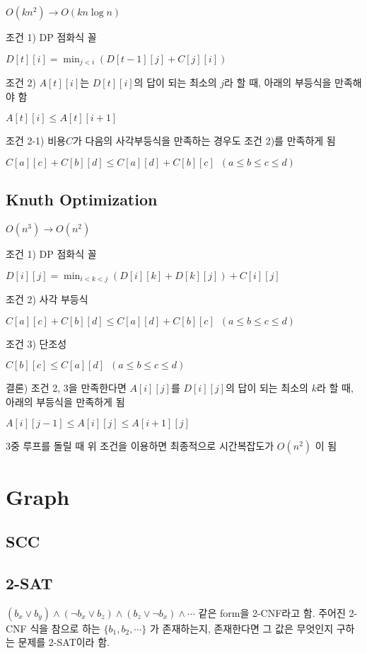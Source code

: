 \documentclass[10pt,landscape,a4paper,twocolumn]{article}
\begin{document}
$O(kn^{2}) \to O(kn\log{n})$

조건 1) DP 점화식 꼴

$D[t][i] = \min_{j<i}( D[t-1][j] + C[j][i] )$

조건 2) $A[t][i]$는 $D[t][i]$의 답이 되는 최소의 $j$라 할 때, 아래의 부등식을 만족해야 함

$A[t][i] \leq A[t][i+1]$

조건 2-1) 비용$C$가 다음의 사각부등식을 만족하는 경우도 조건 2)를 만족하게 됨

$C[a][c] + C[b][d] \leq C[a][d] + C[b][c] \phantom{1} (a \leq b \leq c \leq d)$

\subsection{Knuth Optimization}

$O(n^{3}) \to O(n^{2})$

조건 1) DP 점화식 꼴

$D[i][j] = \min_{i<k<j}( D[i][k] + D[k][j] ) + C[i][j]$

조건 2) 사각 부등식

$C[a][c] + C[b][d] \leq C[a][d] + C[b][c] \phantom{1} (a \leq b \leq c \leq d)$

조건 3) 단조성

$C[b][c] \leq C[a][d] \phantom{1} (a \leq b \leq c \leq d)$

결론) 조건 2, 3을 만족한다면  $A[i][j]$를 $D[i][j]$의 답이 되는 최소의 $k$라 할 때, 아래의 부등식을 만족하게 됨

$A[i][j-1] \leq A[i][j] \leq A[i+1][j]$

3중 루프를 돌릴 때 위 조건을 이용하면 최종적으로 시간복잡도가 $O(n^{2})$ 이 됨

\section{Graph}

\subsection{SCC}


\subsection{2-SAT}

$(b_{x} \lor b_{y}) \land (\neg b_{x} \lor b_{z}) \land (b_{z} \lor \neg b_{x}) \land \cdots$ 같은 form을 2-CNF라고 함. 주어진 2-CNF 식을 참으로 하는 $\{ b_1, b_2, \cdots \}$ 가 존재하는지, 존재한다면 그 값은 무엇인지 구하는 문제를 2-SAT이라 함.
\end{document}
